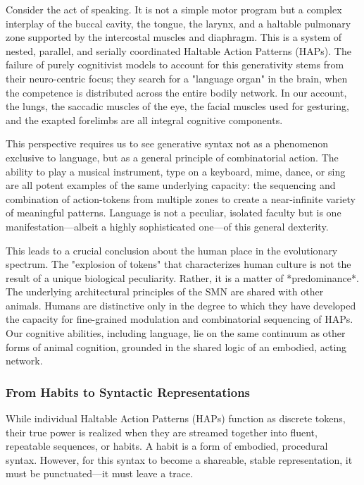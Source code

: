 Consider the act of speaking. It is not a simple motor program but a complex interplay of the buccal cavity, the tongue, the larynx, and a haltable pulmonary zone supported by the intercostal muscles and diaphragm. This is a system of nested, parallel, and serially coordinated Haltable Action Patterns (HAPs). The failure of purely cognitivist models to account for this generativity stems from their neuro-centric focus; they search for a "language organ" in the brain, when the competence is distributed across the entire bodily network. In our account, the lungs, the saccadic muscles of the eye, the facial muscles used for gesturing, and the exapted forelimbs are all integral cognitive components.

This perspective requires us to see generative syntax not as a phenomenon exclusive to language, but as a general principle of combinatorial action. The ability to play a musical instrument, type on a keyboard, mime, dance, or sing are all potent examples of the same underlying capacity: the sequencing and combination of action-tokens from multiple zones to create a near-infinite variety of meaningful patterns. Language is not a peculiar, isolated faculty but is one manifestation—albeit a highly sophisticated one—of this general dexterity.

This leads to a crucial conclusion about the human place in the evolutionary spectrum. The "explosion of tokens" that characterizes human culture is not the result of a unique biological peculiarity. Rather, it is a matter of *predominance*. The underlying architectural principles of the SMN are shared with other animals. Humans are distinctive only in the degree to which they have developed the capacity for fine-grained modulation and combinatorial sequencing of HAPs. Our cognitive abilities, including language, lie on the same continuum as other forms of animal cognition, grounded in the shared logic of an embodied, acting network.

\subsubsection*{From Habits to Syntactic Representations}
While individual Haltable Action Patterns (HAPs) function as discrete tokens, their true power is realized when they are streamed together into fluent, repeatable sequences, or habits. A habit is a form of embodied, procedural syntax. However, for this syntax to become a shareable, stable representation, it must be punctuated—it must leave a trace.

